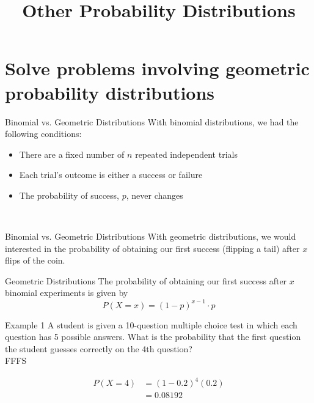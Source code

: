 \documentclass[t]{beamer}
\title{Other Probability Distributions}
\author{}
\date{}
\begin{document}
\begin{frame} 
\maketitle
\end{frame}

\section{Solve problems involving geometric probability distributions}

\begin{frame}{Binomial vs. Geometric Distributions}
With binomial distributions, we had the following conditions:
	\begin{itemize}
		\item There are a fixed number of $n$ repeated independent trials
		\item Each trial's outcome is either a success or failure
		\item The probability of success, $p$, never changes
	\end{itemize}	
	\vspace{10pt}
	\newline\\
\end{frame}

\begin{frame}{Binomial vs. Geometric Distributions}
With geometric distributions, we would interested in the probability of obtaining our first success (flipping a tail) after $x$ flips of the coin.	\newline\\	
\end{frame}

\begin{frame}{Geometric Distributions}
The probability of obtaining our first success after $x$ binomial experiments is given by
\[P(X=x) = (1-p)^{x-1} \cdot p\]
\end{frame}

\begin{frame}{Example 1}
A student is given a 10-question multiple choice test in which each question has 5 possible answers. What is the probability that the first question the student guesses correctly on the 4th question?	\newline\\

FFFS	

\begin{align*}
P(X = 4) &= (1-0.2)^4 (0.2)	\\
&= 0.08192
\end{align*}
\end{frame}
\end{document}
